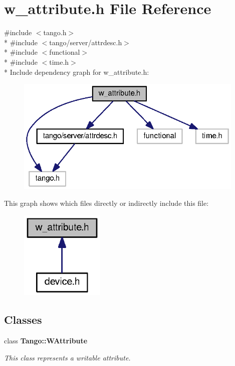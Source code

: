 \section{w\-\_\-attribute.\-h File Reference}
\label{w__attribute_8h}
{\ttfamily \#include $<$tango.\-h$>$}\\*
{\ttfamily \#include $<$tango/server/attrdesc.\-h$>$}\\*
{\ttfamily \#include $<$functional$>$}\\*
{\ttfamily \#include $<$time.\-h$>$}\\*
Include dependency graph for w\-\_\-attribute.\-h\-:
\nopagebreak
\begin{figure}[H]
\begin{center}
\leavevmode
\includegraphics[width=310pt]{d6/d85/w__attribute_8h__incl}
\end{center}
\end{figure}
This graph shows which files directly or indirectly include this file\-:
\nopagebreak
\begin{figure}[H]
\begin{center}
\leavevmode
\includegraphics[width=114pt]{da/d9e/w__attribute_8h__dep__incl}
\end{center}
\end{figure}
\subsection*{Classes}
\begin{DoxyCompactItemize}
\item 
class {\bf Tango\-::\-W\-Attribute}
\begin{DoxyCompactList}\small\item\em This class represents a writable attribute. \end{DoxyCompactList}\end{DoxyCompactItemize}
